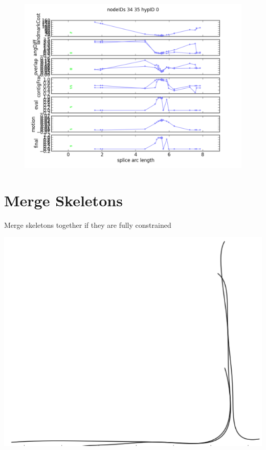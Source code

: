 \begin{figure}[htbp]
\centering
\includegraphics[keepaspectratio,width=\textwidth,height=0.75\textheight]{PastedGraphic12.pdf}
\label{pastedgraphic12.pdf}
\end{figure}




\section{Merge Skeletons}
\label{mergeskeletons}

Merge skeletons together if they are fully constrained

\includegraphics[keepaspectratio,width=\textwidth,height=0.75\textheight]{PastedGraphic14.pdf}

